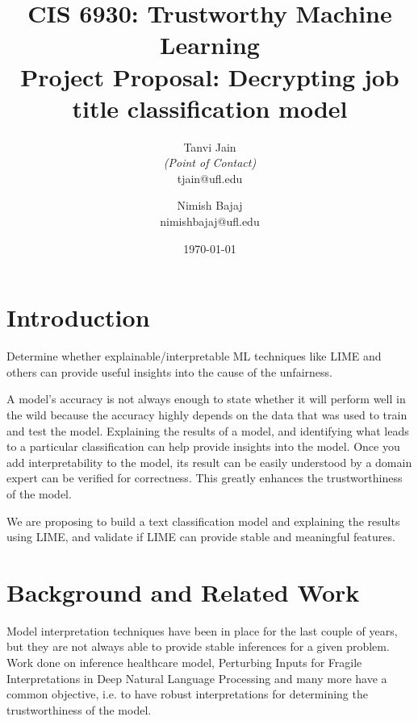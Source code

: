 \documentclass[11pt,letterpaper]{article}
\title{CIS 6930: Trustworthy Machine Learning\\
	\Large Project Proposal: Decrypting job title classification model} %
\author{
        Tanvi Jain \\{\em (Point of Contact)} \\
        tjain@ufl.edu\\
        \and
        Nimish Bajaj \\
        nimishbajaj@ufl.edu\\
}
\date{\today}
\begin{document}

\maketitle




\section{Introduction}


Determine whether explainable/interpretable ML techniques like LIME and others can provide useful insights into the cause of the unfairness.

A model's accuracy is not always enough to state whether it will perform well in the wild because the accuracy highly depends on the data that was used to train and test the model. 
Explaining the results of a model, and identifying what leads to a particular classification can help provide insights into the model.
Once you add interpretability to the model, its result can be easily understood by a domain expert can be verified for correctness. This greatly enhances the trustworthiness of the model.


We are proposing to build a text classification model and explaining the results using LIME, and validate if LIME can provide stable and meaningful features. 


\section{Background and Related Work}

Model interpretation techniques have been in place for the last couple of years, but they are not always able to provide stable inferences for a given problem. 
Work done on inference healthcare model\cite{Rasheed2021}, Perturbing Inputs for Fragile Interpretations in Deep Natural Language Processing \cite{sinha2021perturbing} and many more have a common objective, i.e. to have robust interpretations for determining the trustworthiness of the model.
\end{document}
